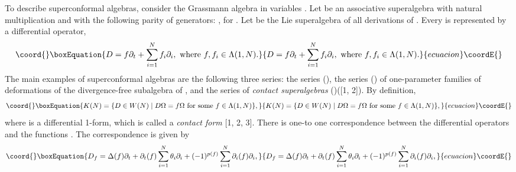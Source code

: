 \documentclass[a4paper,a4paper]{article}
\begin{document}
To describe superconformal algebras, consider
the Grassmann algebra \coordHE{} in \coordHE{} variables
\coordHE{}. Let
\coordHE{} be an associative
superalgebra with natural multiplication and with the following parity 
of generators: \coordHE{}, \coordHE{}
for \coordHE{}. Let
\coordHE{} be the Lie superalgebra of all derivations of
\coordHE{}.
Every \coordHE{} is represented by a differential operator,
\begin{equation}\coord{}\boxEquation{
D = f\partial_t + \sum_{i=1}^N f_i \partial_i, \hbox{ where }
f, f_i \in  \Lambda(1, N).
}{
D = f\partial_t + \sum_{i=1}^N f_i \partial_i, \hbox{ where }
f, f_i \in  \Lambda(1, N).
}{ecuacion}\coordE{}\end{equation}
The main examples  of superconformal algebras are the following three series:
the series \coordHE{} (\coordHE{}), the series \coordHE{} (\coordHE{})
of one-parameter families
of deformations of the divergence-free subalgebra of \coordHE{},
and the series of {\it contact superalgebras} \coordHE{} (\coordHE{})([1, 2]).
By definition,
\begin{equation}\coord{}\boxEquation{
K(N) = \lbrace D \in W(N)\mid D\Omega  = f\Omega \hbox{ for some }
f\in \Lambda(1, N)\rbrace, 
}{
K(N) = \lbrace D \in W(N)\mid D\Omega  = f\Omega \hbox{ for some }
f\in \Lambda(1, N)\rbrace, 
}{ecuacion}\coordE{}\end{equation}
where
\coordHE{}
is a differential 1-form, which is called a {\it contact form} [1, 2, 3].
There is one-to one correspondence between the differential operators
\coordHE{} and the functions \coordHE{}.
The correspondence \coordHE{} is given by
\begin{equation}\coord{}\boxEquation{
D_f = \Delta(f)\partial_t + \partial_t(f)\sum_{i=1}^N \theta_i\partial_i
+ (-1)^{p(f)}\sum_{i=1}^N\partial_i(f)\partial_i,
}{
D_f = \Delta(f)\partial_t + \partial_t(f)\sum_{i=1}^N \theta_i\partial_i
+ (-1)^{p(f)}\sum_{i=1}^N\partial_i(f)\partial_i,
}{ecuacion}\coordE{}\end{equation}
\end{document}
